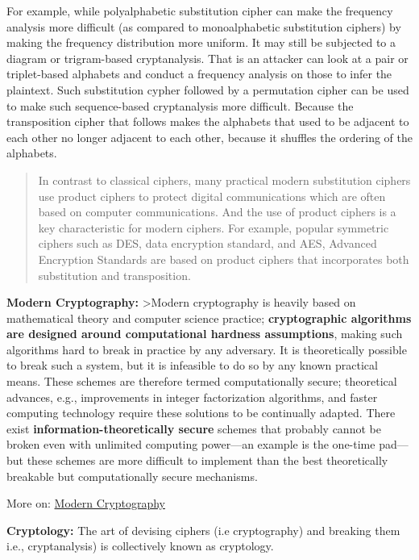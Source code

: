 \documentclass[11pt]{article}
\begin{document}
For example, while polyalphabetic substitution cipher can make the
frequency analysis more difficult (as compared to monoalphabetic
substitution ciphers) by making the frequency distribution more uniform.
It may still be subjected to a diagram or trigram-based cryptanalysis.
That is an attacker can look at a pair or triplet-based alphabets and
conduct a frequency analysis on those to infer the plaintext. Such
substitution cypher followed by a permutation cipher can be used to make
such sequence-based cryptanalysis more difficult. Because the
transposition cipher that follows makes the alphabets that used to be
adjacent to each other no longer adjacent to each other, because it
shuffles the ordering of the alphabets.

\begin{quote}
In contrast to classical ciphers, many practical modern substitution
ciphers use product ciphers to protect digital communications which are
often based on computer communications. And the use of product ciphers
is a key characteristic for modern ciphers. For example, popular
symmetric ciphers such as DES, data encryption standard, and AES,
Advanced Encryption Standards are based on product ciphers that
incorporates both substitution and transposition.
\end{quote}

\textbf{Modern Cryptography:} \textgreater{}Modern cryptography is
heavily based on mathematical theory and computer science practice;
\textbf{cryptographic algorithms are designed around computational
hardness assumptions}, making such algorithms hard to break in practice
by any adversary. It is theoretically possible to break such a system,
but it is infeasible to do so by any known practical means. These
schemes are therefore termed computationally secure; theoretical
advances, e.g., improvements in integer factorization algorithms, and
faster computing technology require these solutions to be continually
adapted. There exist \textbf{information-theoretically secure} schemes
that probably cannot be broken even with unlimited computing power---an
example is the one-time pad---but these schemes are more difficult to
implement than the best theoretically breakable but computationally
secure mechanisms.

More on:
\href{https://www.tutorialspoint.com/cryptography/modern_cryptography.htm}{Modern
Cryptography}

\textbf{Cryptology:} The art of devising ciphers (i.e cryptography) and
breaking them i.e., cryptanalysis) is collectively known as cryptology.
\end{document}
